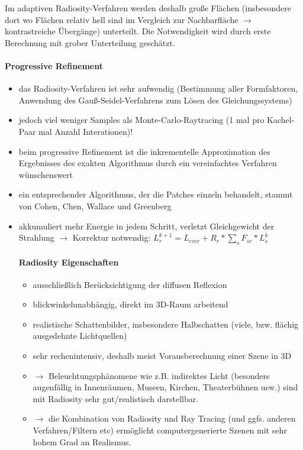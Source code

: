 \documentclass[10pt,landscape]{article}
\begin{document}
\begin{multicols}{3}
{  Im adaptiven Radiosity-Verfahren werden deshalb große Flächen (insbesondere dort wo Flächen relativ hell sind im Vergleich zur Nachbarfläche $\rightarrow$ kontrastreiche Übergänge) unterteilt. Die Notwendigkeit wird durch erste Berechnung mit grober Unterteilung geschätzt.
  
  \paragraph{Progressive Refinement}
  \begin{itemize}
  \item das Radiosity-Verfahren ist sehr aufwendig (Bestimmung aller Formfaktoren, Anwendung des Gauß-Seidel-Verfahrens zum Lösen des Gleichungssystems)
  \item jedoch viel weniger Samples als Monte-Carlo-Raytracing (1 mal pro Kachel-Paar mal Anzahl Interationen)!
  \item beim progressive Refinement ist die inkrementelle Approximation des Ergebnisses des exakten Algorithmus durch ein vereinfachtes Verfahren wünschenswert
  \item ein entsprechender Algorithmus, der die Patches einzeln behandelt, stammt von Cohen, Chen, Wallace und Greenberg
  \item akkumuliert mehr Energie in jedem Schritt, verletzt Gleichgewicht der Strahlung $\rightarrow$ Korrektur notwendig:
  $L_r^{k+1}=L_{emr} + R_r*\sum_s F_{sr}* L_s^k$
  
  
  \paragraph{Radiosity Eigenschaften}
  \begin{itemize}
  \item ausschließlich Berücksichtigung der diffusen Reflexion
  \item blickwinkelunabhängig, direkt im 3D-Raum arbeitend
  \item realistische Schattenbilder, insbesondere Halbschatten (viele, bzw. flächig ausgedehnte Lichtquellen)
  \item sehr rechenintensiv, deshalb meist Vorausberechnung einer Szene in 3D
  \item $\rightarrow$ Beleuchtungsphänomene wie z.B. indirektes Licht (besonders augenfällig in Innenräumen, Museen, Kirchen, Theaterbühnen usw.) sind mit Radiosity sehr gut/realistisch darstellbar.
  \item $\rightarrow$ die Kombination von Radiosity und Ray Tracing (und ggfs. anderen Verfahren/Filtern etc) ermöglicht computergenerierte Szenen mit sehr hohem Grad an Realismus.
  \end{itemize}
  

\end{itemize}}
\end{multicols}
\end{document}
